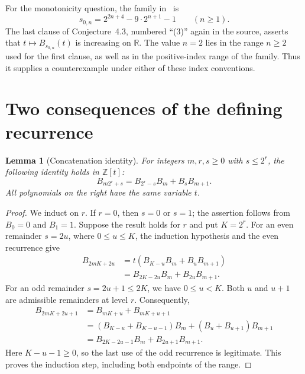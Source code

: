 \documentclass[11pt]{article}
\newtheorem{lemma}[theorem]{Lemma}
\theoremstyle{remark}
\newcommand{\R}{\mathbb{R}}
\newcommand{\Z}{\mathbb{Z}}
\begin{document}
For the monotonicity question, the family in~\cite[Theorem~2.6]{Ulas} is
\begin{equation}\label{eq:s}
 s_{0,n}=2^{2n+4}-9\cdot2^{n+1}-1\qquad(n\geq1).
\end{equation}
The last clause of Conjecture~4.3, numbered ``(3)'' again in the source,
asserts that $t\mapsto B_{s_{0,n}}(t)$ is increasing on $\R$.
The value $n=2$ lies in the range $n\geq2$ used for the first clause,
as well as in the positive-index range of the family. Thus it supplies
a counterexample under either of these index conventions.

\section{Two consequences of the defining recurrence}

\begin{lemma}[Concatenation identity]\label{lem:concat}
For integers $m,r,s\geq0$ with $s\leq2^r$, the following identity holds
in $\Z[t]$:
\begin{equation}\label{eq:concat}
 B_{m2^r+s}=B_{2^r-s}B_m+B_sB_{m+1}.
\end{equation}
All polynomials on the right have the same variable $t$.
\end{lemma}
\begin{proof}
We induct on $r$. If $r=0$, then $s=0$ or $s=1$;
the assertion follows from $B_0=0$ and $B_1=1$.
Suppose the result holds for $r$ and put $K=2^r$.
For an even remainder $s=2u$, where $0\leq u\leq K$, the induction
hypothesis and the even recurrence give
\begin{align*}
 B_{2mK+2u}
 &=t(B_{K-u}B_m+B_uB_{m+1})\\
 &=B_{2K-2u}B_m+B_{2u}B_{m+1}.
\end{align*}
For an odd remainder $s=2u+1\leq2K$, we have $0\leq u<K$.
Both $u$ and $u+1$ are admissible remainders at level $r$.
Consequently,
\begin{align*}
 B_{2mK+2u+1}
 &=B_{mK+u}+B_{mK+u+1}\\
 &=(B_{K-u}+B_{K-u-1})B_m+(B_u+B_{u+1})B_{m+1}\\
 &=B_{2K-2u-1}B_m+B_{2u+1}B_{m+1}.
\end{align*}
Here $K-u-1\geq0$, so the last use of the odd recurrence is legitimate.
This proves the induction step, including both endpoints of the range.
\end{proof}
\end{document}
